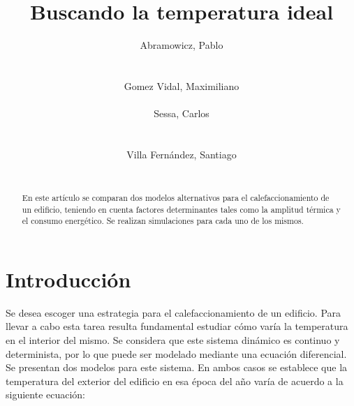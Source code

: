 \documentclass{sig-alternate}
\begin{document}

\title{Buscando la temperatura ideal}


\author{
    \alignauthor
    Abramowicz, Pablo\\
     \\
    \ \\
    Gomez Vidal, Maximiliano\\
     \\
    \alignauthor
    Sessa, Carlos\\
     \\
    \ \\
    Villa Fern\'{a}ndez, Santiago\\
     \\
}

\maketitle

\begin{abstract}
En este art\'{i}culo se comparan dos modelos alternativos para el 
calefaccionamiento de un edificio, teniendo en cuenta factores determinantes 
tales como la amplitud t\'{e}rmica y el consumo energ\'{e}tico. Se realizan 
simulaciones para cada uno de los mismos.
\end{abstract}


\section{Introducci\'{o}n}\label{introduccion}

Se desea escoger una estrategia para el calefaccionamiento de un
edificio. Para llevar a cabo esta tarea resulta fundamental estudiar c\'{o}mo 
var\'{i}a la temperatura en el interior del mismo. Se considera que este sistema 
din\'{a}mico es continuo y determinista, por lo que puede ser modelado mediante 
una ecuaci\'{o}n diferencial.
\ \\
Se presentan dos modelos para este sistema. En ambos casos se establece que
la temperatura del exterior del edificio en esa \'{e}poca del a\~{n}o
var\'{i}a de acuerdo a la siguiente ecuaci\'{o}n:
\end{document}
